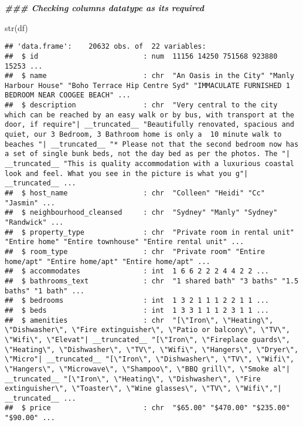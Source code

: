 \documentclass[
]{article}
\newenvironment{Shaded}{\begin{snugshade}}{\end{snugshade}}
\newcommand{\DocumentationTok}[1]{\textcolor[rgb]{0.56,0.35,0.01}{\textbf{\textit{#1}}}}
\newcommand{\FunctionTok}[1]{\textcolor[rgb]{0.00,0.00,0.00}{#1}}
\newcommand{\NormalTok}[1]{#1}
\begin{document}
\begin{Shaded}
\begin{Highlighting}[]
\DocumentationTok{\#\#\# Checking columns datatype as it\textquotesingle{}s required}

\FunctionTok{str}\NormalTok{(df)}
\end{Highlighting}
\end{Shaded}

\begin{verbatim}
## 'data.frame':    20632 obs. of  22 variables:
##  $ id                         : num  11156 14250 751568 923880 15253 ...
##  $ name                       : chr  "An Oasis in the City" "Manly Harbour House" "Boho Terrace Hip Centre Syd" "IMMACULATE FURNISHED 1 BEDROOM NEAR COOGEE BEACH" ...
##  $ description                : chr  "Very central to the city which can be reached by an easy walk or by bus, with transport at the door, if require"| __truncated__ "Beautifully renovated, spacious and quiet, our 3 Bedroom, 3 Bathroom home is only a  10 minute walk to beaches "| __truncated__ "* Please not that the second bedroom now has a set of single bunk beds, not the day bed as per the photos. The "| __truncated__ "This is quality accommodation with a luxurious coastal look and feel. What you see in the picture is what you g"| __truncated__ ...
##  $ host_name                  : chr  "Colleen" "Heidi" "Cc" "Jasmin" ...
##  $ neighbourhood_cleansed     : chr  "Sydney" "Manly" "Sydney" "Randwick" ...
##  $ property_type              : chr  "Private room in rental unit" "Entire home" "Entire townhouse" "Entire rental unit" ...
##  $ room_type                  : chr  "Private room" "Entire home/apt" "Entire home/apt" "Entire home/apt" ...
##  $ accommodates               : int  1 6 6 2 2 2 4 4 2 2 ...
##  $ bathrooms_text             : chr  "1 shared bath" "3 baths" "1.5 baths" "1 bath" ...
##  $ bedrooms                   : int  1 3 2 1 1 1 2 2 1 1 ...
##  $ beds                       : int  1 3 3 1 1 1 2 3 1 1 ...
##  $ amenities                  : chr  "[\"Iron\", \"Heating\", \"Dishwasher\", \"Fire extinguisher\", \"Patio or balcony\", \"TV\", \"Wifi\", \"Elevat"| __truncated__ "[\"Iron\", \"Fireplace guards\", \"Heating\", \"Dishwasher\", \"TV\", \"Wifi\", \"Hangers\", \"Dryer\", \"Micro"| __truncated__ "[\"Iron\", \"Dishwasher\", \"TV\", \"Wifi\", \"Hangers\", \"Microwave\", \"Shampoo\", \"BBQ grill\", \"Smoke al"| __truncated__ "[\"Iron\", \"Heating\", \"Dishwasher\", \"Fire extinguisher\", \"Toaster\", \"Wine glasses\", \"TV\", \"Wifi\","| __truncated__ ...
##  $ price                      : chr  "$65.00" "$470.00" "$235.00" "$90.00" ...

\end{verbatim}
\end{document}
